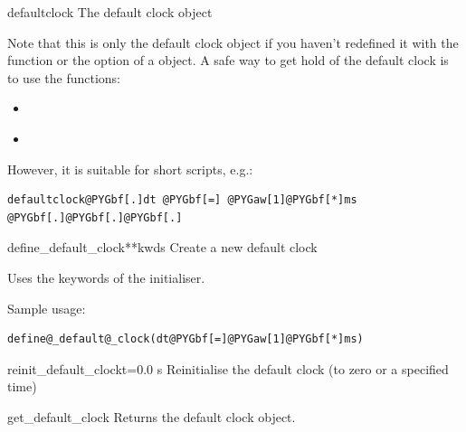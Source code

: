 \documentclass[letterpaper,10pt,english]{manual}
\begin{document}
\hypertarget{brian.defaultclock}{}\begin{datadesc}{defaultclock}
The default clock object

Note that this is only the default clock object if you haven't
redefined it with the \hyperlink{brian.define_default_clock}{} function or the
 option of a \hyperlink{brian.Clock}{} object. A safe way to
get hold of the default clock is to use the functions:
\begin{itemize}
\item {} 
\hyperlink{brian.get_default_clock}{}

\item {} 
\hyperlink{brian.reinit_default_clock}{}

\end{itemize}

However, it is suitable for short scripts, e.g.:

\begin{Verbatim}[commandchars=@\[\]]
defaultclock@PYGbf[.]dt @PYGbf[=] @PYGaw[1]@PYGbf[*]ms
@PYGbf[.]@PYGbf[.]@PYGbf[.]
\end{Verbatim}
\end{datadesc}

\hypertarget{brian.define_default_clock}{}\begin{funcdesc}{define\_default\_clock}{**kwds}
Create a new default clock

Uses the keywords of the \hyperlink{brian.Clock}{} initialiser.

Sample usage:

\begin{Verbatim}[commandchars=@\[\]]
define@_default@_clock(dt@PYGbf[=]@PYGaw[1]@PYGbf[*]ms)
\end{Verbatim}
\end{funcdesc}

\hypertarget{brian.reinit_default_clock}{}\begin{funcdesc}{reinit\_default\_clock}{t=0.0 s}
Reinitialise the default clock (to zero or a specified time)
\end{funcdesc}

\hypertarget{brian.get_default_clock}{}\begin{funcdesc}{get\_default\_clock}{}
Returns the default clock object.
\end{funcdesc}
\end{document}
